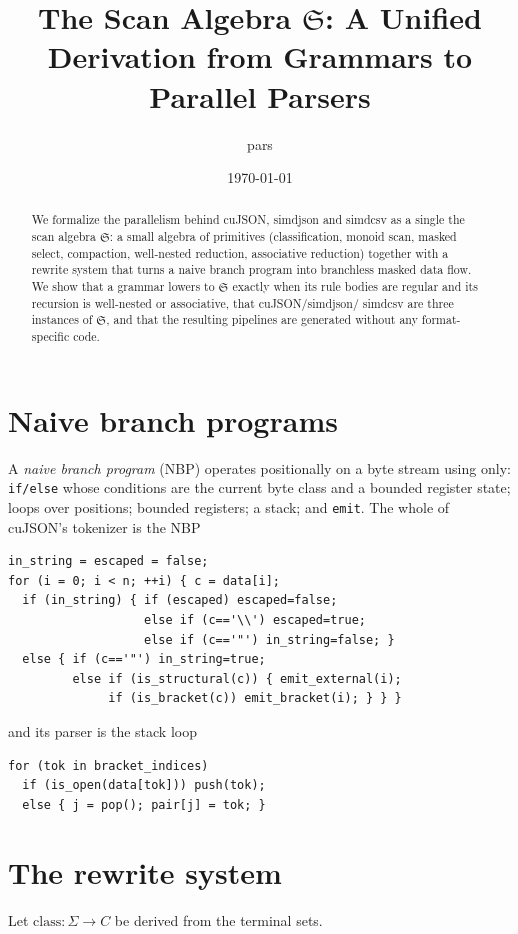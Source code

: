 \documentclass[11pt]{article}
\title{The Scan Algebra $\mathfrak{S}$: A Unified Derivation from Grammars to Parallel Parsers}
\author{pars}
\date{\today}
\begin{document}
\maketitle

\begin{abstract}
We formalize the parallelism behind cuJSON, simdjson and simdcsv as a single
the scan algebra $\mathfrak{S}$: a small algebra of primitives (classification, monoid scan, masked
select, compaction, well-nested reduction, associative reduction) together with
a rewrite system that turns a naive branch program into branchless masked data
flow.  We show that a grammar lowers to $\mathfrak{S}$ exactly when its rule bodies are
regular and its recursion is well-nested or associative, that cuJSON/simdjson/
simdcsv are three instances of $\mathfrak{S}$, and that the resulting pipelines are
generated without any format-specific code.
\end{abstract}

\section{Naive branch programs}
A \emph{naive branch program} (NBP) operates positionally on a byte stream using
only: \texttt{if/else} whose conditions are the current byte class and a bounded
register state; loops over positions; bounded registers; a stack; and
\texttt{emit}.  The whole of cuJSON's tokenizer is the NBP
\begin{lstlisting}
in_string = escaped = false;
for (i = 0; i < n; ++i) { c = data[i];
  if (in_string) { if (escaped) escaped=false;
                   else if (c=='\\') escaped=true;
                   else if (c=='"') in_string=false; }
  else { if (c=='"') in_string=true;
         else if (is_structural(c)) { emit_external(i);
              if (is_bracket(c)) emit_bracket(i); } } }
\end{lstlisting}
and its parser is the stack loop
\begin{lstlisting}
for (tok in bracket_indices)
  if (is_open(data[tok])) push(tok);
  else { j = pop(); pair[j] = tok; }
\end{lstlisting}

\section{The rewrite system}
Let $\mathrm{class}:\Sigma\to C$ be derived from the terminal sets.
\end{document}
